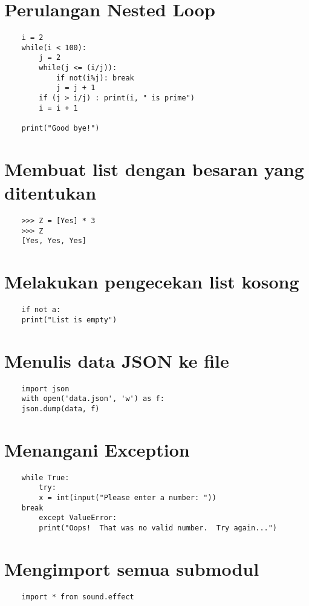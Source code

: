 \documentclass[12pt]{article} %
\begin{document}
\section{Perulangan Nested Loop}
\begin{lstlisting}
	i = 2
	while(i < 100):
	    j = 2
	    while(j <= (i/j)):
	        if not(i%j): break
	        j = j + 1
	    if (j > i/j) : print(i, " is prime")
	    i = i + 1
	
	print("Good bye!")
\end{lstlisting}

\section {Membuat list dengan besaran yang ditentukan}
\begin{lstlisting}
	>>> Z = [Yes] * 3
	>>> Z
	[Yes, Yes, Yes]
\end{lstlisting}

\section {Melakukan pengecekan list kosong}
\begin{lstlisting}
	if not a:
	print("List is empty")
\end{lstlisting}

\section {Menulis data JSON ke file}
\begin{lstlisting}
	import json
	with open('data.json', 'w') as f:
	json.dump(data, f)
\end{lstlisting}
	
\section{Menangani Exception}
\begin{lstlisting}
	while True:
		try:
		x = int(input("Please enter a number: "))
	break
		except ValueError:
		print("Oops!  That was no valid number.  Try again...")

\end{lstlisting}

\section{Mengimport semua submodul}
\begin{lstlisting}
	import * from sound.effect
\end{lstlisting}
\end{document}
